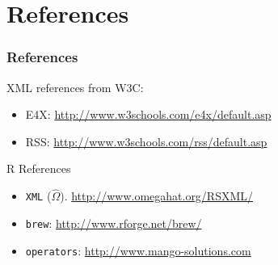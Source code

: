 \documentclass[smaller]{beamer}
\newcommand{\rfun}[1]{\texttt{#1}}
\begin{document}
{
 \begin{frame}[fragile][plain]
 \end{frame}
}



\begin{frame}[fragile][plain]

\end{frame}
 
\section{References}

\begin{frame}[fragile]
\frametitle{References}

XML references from W3C: 
\begin{itemize}
 \item E4X: \url{http://www.w3schools.com/e4x/default.asp}
 \item RSS: \url{http://www.w3schools.com/rss/default.asp}
\end{itemize}

R References
\begin{itemize}
 \item \rfun{XML} ($\hat{\Omega}$). \url{http://www.omegahat.org/RSXML/}
 \item \rfun{brew}: \url{http://www.rforge.net/brew/}
 \item \rfun{operators}: \url{http://www.mango-solutions.com}
\end{itemize}

\end{frame}
\end{document}
